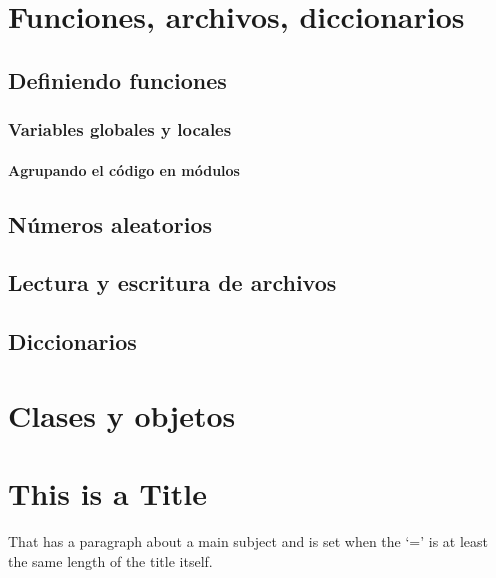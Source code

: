 \documentclass[letterpaper,10pt,spanish]{sphinxmanual}
\begin{document}
\chapter{Funciones, archivos, diccionarios}
\label{Unidad04::doc}\label{Unidad04:funciones-archivos-diccionarios}

\section{Definiendo funciones}
\label{Unidad04:definiendo-funciones}

\subsection{Variables globales y locales}
\label{Unidad04:variables-globales-y-locales}

\subsubsection{Agrupando el código en módulos}
\label{Unidad04:agrupando-el-codigo-en-modulos}

\section{Números aleatorios}
\label{Unidad04:numeros-aleatorios}

\section{Lectura y escritura de archivos}
\label{Unidad04:lectura-y-escritura-de-archivos}

\section{Diccionarios}
\label{Unidad04:diccionarios}

\chapter{Clases y objetos}
\label{Unidad05::doc}\label{Unidad05:clases-y-objetos}

\chapter{This is a Title}
\label{example::doc}\label{example:this-is-a-title}
That has a paragraph about a main subject and is set when the `='
is at least the same length of the title itself.
\end{document}
